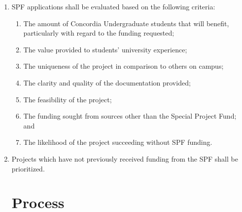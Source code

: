 \documentclass[oneside]{book}
\begin{document}
\begin{enumerate}
\item SPF applications shall be evaluated based on the following criteria:
	\begin{enumerate}
	\item The amount of Concordia Undergraduate students that will benefit, particularly with regard to the funding requested;
	\item The value provided to students’ university experience;
	\item The uniqueness of the project in comparison to others on campus;
	\item The clarity and quality of the documentation provided;
	\item The feasibility of the project;
	\item The funding sought from sources other than the Special Project Fund; and
	\item The likelihood of the project succeeding without SPF funding.
	\end{enumerate}
\item Projects which have not previously received funding from the SPF shall be prioritized. 

\chapter{\label{SPF_Process}Process}


\end{enumerate}
\end{document}

